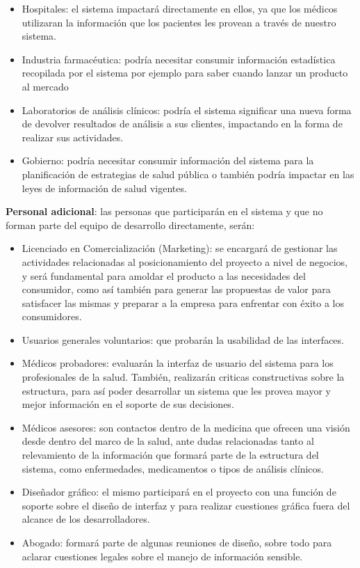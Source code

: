 \begin{enumerate}
    \begin{itemize}
        \item Hospitales: el sistema impactará directamente en ellos, ya que los médicos utilizaran la información que los pacientes les provean a través de nuestro sistema.
        \item Industria farmacéutica: podría necesitar consumir información estadística recopilada por el sistema por ejemplo para saber cuando lanzar un producto al mercado
        \item Laboratorios de análisis clínicos: podría el sistema significar una nueva forma de devolver resultados de análisis a sus clientes, impactando en la forma de realizar sus actividades.
        \item Gobierno: podría necesitar consumir información del sistema para la planificación de estrategias de salud pública o también podría impactar en las leyes de información de salud vigentes.
    \end{itemize}

    \textbf{Personal adicional}: las personas que participarán en el sistema y que no forman parte del equipo de desarrollo directamente, serán:

 \begin{itemize}
     \item Licenciado en Comercialización (Marketing): se encargará de gestionar las actividades relacionadas al posicionamiento del proyecto a nivel de negocios, y será fundamental para amoldar el producto a las necesidades del consumidor, como así también para generar las propuestas de valor para satisfacer las mismas y preparar a la empresa para enfrentar con éxito a los consumidores.
	\item Usuarios generales voluntarios: que probarán la usabilidad de las interfaces.
    \item Médicos probadores: evaluarán la interfaz de usuario del sistema para los profesionales de la salud.
    También, realizarán criticas constructivas sobre la estructura, para así poder desarrollar un sistema que les provea mayor y mejor información en el soporte de sus decisiones.
    \item Médicos asesores: son contactos dentro de la medicina que ofrecen una visión desde dentro del marco de la salud, ante dudas relacionadas tanto al relevamiento de la información que formará parte de la estructura del sistema, como enfermedades, medicamentos o tipos de análisis clínicos.
    \item Diseñador gráfico: el mismo participará en el proyecto con una función de soporte sobre el diseño de interfaz y para realizar cuestiones gráfica fuera del alcance de los desarrolladores.
    \item Abogado: formará parte de algunas reuniones de diseño, sobre todo para aclarar cuestiones legales sobre el manejo de información sensible.
\end{itemize}


\end{enumerate}

